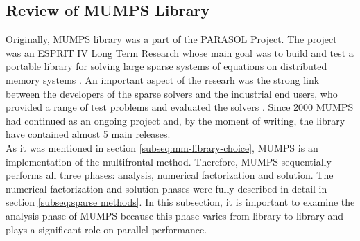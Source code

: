 \subsection{Review of MUMPS Library}
\label{subseq:mumps-review}




Originally, MUMPS library was a part of the PARASOL Project. The project was an ESPRIT IV Long Term Research whose main goal was to build and test a portable library for solving large sparse systems of equations on distributed memory systems \cite{PARASOL}. An important aspect of the researh was the strong link between the developers of the sparse solvers and the industrial end users, who provided a range of test problems and evaluated the solvers \cite{MUMPS:description}. Since 2000 MUMPS had continued as an ongoing project and, by the moment of writing, the library have contained almost 5 main releases.\\



As it was mentioned in section \ref{subseq:mm-library-choice}, MUMPS is an implementation of the multifrontal method. Therefore, MUMPS sequentially performs all three phases: analysis, numerical factorization and solution. The numerical factorization and solution phases were fully described in detail in section \ref{subseq:sparse methods}. In this subsection, it is important to examine the analysis phase of MUMPS because this phase varies from library to library and plays a significant role on parallel performance.\\


